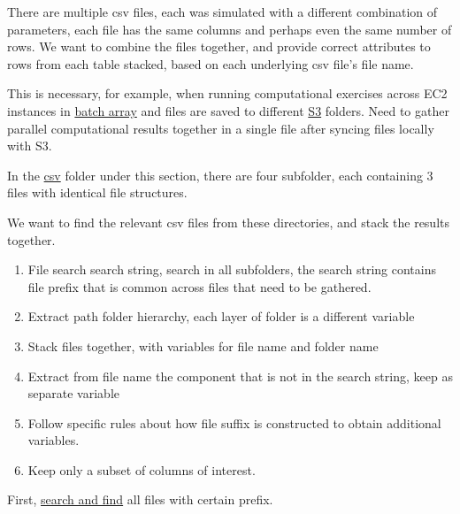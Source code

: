 \documentclass[
]{book}
\providecommand{\tightlist}{%
  \setlength{\itemsep}{0pt}\setlength{\parskip}{0pt}}
\begin{document}
There are multiple csv files, each was simulated with a different combination of parameters, each file has the same columns and perhaps even the same number of rows. We want to combine the files together, and provide correct attributes to rows from each table stacked, based on each underlying csv file's file name.

This is necessary, for example, when running computational exercises across EC2 instances in \href{https://fanwangecon.github.io/Py4Econ/aws/batch/htmlpdfr/fs_aws_batch.html}{batch array} and files are saved to different \href{https://fanwangecon.github.io/Py4Econ/aws/s3/htmlpdfr/fs_aws_s3.html}{S3} folders. Need to gather parallel computational results together in a single file after syncing files locally with S3.

In the \href{https://github.com/FanWangEcon/R4Econ/tree/master/development/inout/_file/csv}{csv} folder under this section, there are four subfolder, each containing 3 files with identical file structures.

We want to find the relevant csv files from these directories, and stack the results together.

\begin{enumerate}
\def\labelenumi{\arabic{enumi}.}
\tightlist
\item
  File search search string, search in all subfolders, the search string contains file prefix that is common across files that need to be gathered.
\item
  Extract path folder hierarchy, each layer of folder is a different variable
\item
  Stack files together, with variables for file name and folder name
\item
  Extract from file name the component that is not in the search string, keep as separate variable
\item
  Follow specific rules about how file suffix is constructed to obtain additional variables.
\item
  Keep only a subset of columns of interest.
\end{enumerate}

First, \href{https://fanwangecon.github.io/R4Econ/development/inout/htmlpdfr/fs_rmd_pdf_html.html\#11_Search_and_Find_all_Files_in_Repository}{search and find} all files with certain prefix.
\end{document}
